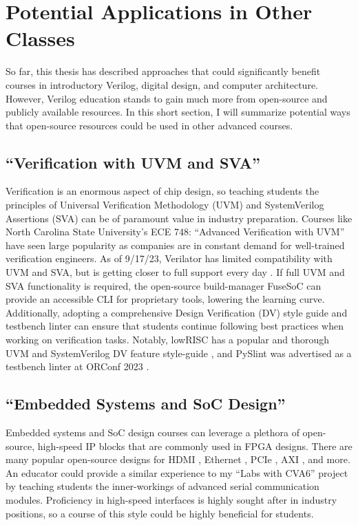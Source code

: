 
\chapter{Potential Applications in Other Classes}
\label{chapter:other_classes}

So far, this thesis has described approaches that could significantly benefit courses in introductory Verilog, digital design, and computer architecture.
However, Verilog education stands to gain much more from open-source and publicly available resources.
In this short section, I will summarize potential ways that open-source resources could be used in other advanced courses.

\section{\enquote{Verification with UVM and SVA}}

Verification is an enormous aspect of chip design, so teaching students the principles of Universal Verification Methodology (UVM) and SystemVerilog Assertions (SVA) can be of paramount value in industry preparation.
Courses like North Carolina State University's ECE 748: \enquote{Advanced Verification with UVM} have seen large popularity as companies are in constant demand for well-trained verification engineers.
As of 9/17/23, Verilator has limited compatibility with UVM and SVA, but is getting closer to full support every day \cite{VerilatorUVM, BieganskiORConf, VerilatorSVA}.
If full UVM and SVA functionality is required, the open-source build-manager FuseSoC can provide an accessible CLI for proprietary tools, lowering the learning curve.
Additionally, adopting a comprehensive Design Verification (DV) style guide and testbench linter can ensure that students continue following best practices when working on verification tasks.
Notably, lowRISC has a popular and thorough UVM and SystemVerilog DV feature style-guide \cite{lowRISCstyleguides}, and PySlint was advertised as a testbench linter at ORConf 2023 \cite{paulORConf}.

\section{\enquote{Embedded Systems and SoC Design}}

Embedded systems and SoC design courses can leverage a plethora of open-source, high-speed IP blocks that are commonly used in FPGA designs.
There are many popular open-source designs for HDMI \cite{hdlutilhdmiGitHub, projfdisplaycontrollerGitHub, cliffordwolfSimpleVOutGitHub}, Ethernet \cite{alexforencichverilogethernetGitHub}, PCIe \cite{alexforencichverilogpcieGitHub, enjoydigitallitepcieGitHub}, AXI \cite{pulpplatformaxiGitHub, alexforencichverilogaxiGitHub}, and more.
An educator could provide a similar experience to my \enquote{Labs with CVA6} project by teaching students the inner-workings of advanced serial communication modules.
Proficiency in high-speed interfaces is highly sought after in industry positions, so a course of this style could be highly beneficial for students.

